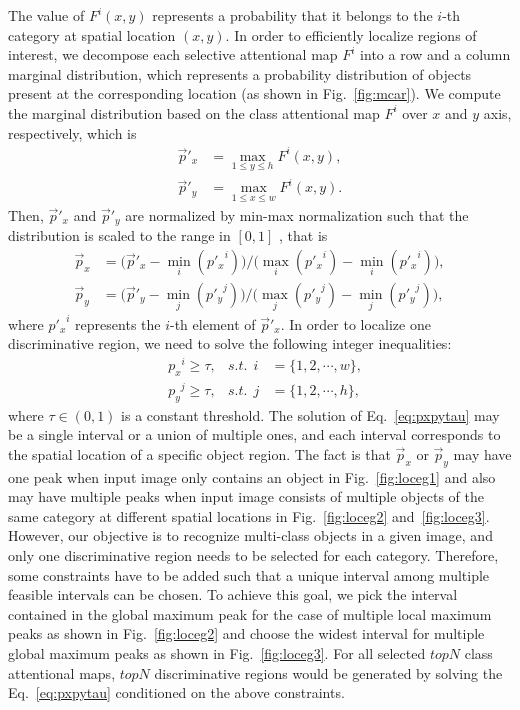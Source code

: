 \documentclass[journal]{IEEEtran}
\begin{document}
The value of $F^i(x,y)$ represents a probability that it belongs to the $i$-th category at spatial location $(x,y)$. 
In order to efficiently localize regions of interest, we decompose each selective attentional map $F^i$ into a row and a column marginal distribution, which represents a probability distribution of objects present at the corresponding location (as shown in Fig.~\ref{fig:mcar}). We compute the marginal distribution based on the class attentional map $F^i$ over $x$ and $y$ axis, respectively, which is
 \begin{equation}\label{eq:margin}
 \begin{aligned}
 \vec p'_x &= \max_{1\leq y \leq h}F^i(x,y), \\
 \vec p'_y &= \max_{1\leq x \leq w}F^i(x,y).
 \end{aligned}
 \end{equation}
 Then, $\vec p'_x$ and $\vec p'_y$ are normalized by min-max normalization such that the distribution is scaled to the range in $[0,1]$ , that is
 \begin{equation}
 \begin{aligned}
\vec p_x &= \big(\vec p'_x - \min_i ({p'_x}^i)\big)/\big (\max_i ({p'_x}^i)- \min_i ({p'_x}^i)\big), \\
\vec p_y &= \big(\vec p'_y - \min_j ({p'_y}^j)\big)/\big(\max_j ({p'_y}^j)- \min_j ({p'_y}^j) \big),
 \end{aligned}
 \end{equation}
where ${p'_x}^i$ represents the $i$-th element of $\vec p'_x$. In order to localize one discriminative region, we need to solve the following integer inequalities:
 \begin{equation}\label{eq:pxpytau}
 \begin{aligned}
 &{p_x}^i  \geq \tau, &s.t. ~~i&=\{1,2,\cdots,w\},\\
 &{p_y}^j  \geq \tau, &s.t. ~~j&=\{1,2,\cdots, h\},
  \end{aligned}
 \end{equation}
where $\tau \in (0,1)$ is a constant threshold. The solution of Eq.~\ref{eq:pxpytau} may be a single interval or a union of multiple ones, and each interval corresponds to the spatial location of a specific object region. The fact is that $\vec p_x$ or $\vec p_y$ may have one peak when input image only contains an object in Fig.~\ref{fig:loceg1} and also may have multiple peaks when input image consists of multiple objects of the same category at different spatial locations in Fig.~\ref{fig:loceg2} and~\ref{fig:loceg3}. However, our objective is to recognize multi-class objects in a given image, and only one discriminative region needs to be selected for each category. Therefore, some constraints have to be added such that a unique interval among multiple feasible intervals can be chosen. To achieve this goal, we pick the interval contained in the global maximum peak for the case of multiple local maximum peaks as shown in Fig.~\ref{fig:loceg2} and choose the widest interval for multiple global maximum peaks as shown in Fig.~\ref{fig:loceg3}. For all selected $topN$ class attentional maps, $topN$ discriminative regions would be generated by solving the Eq.~\ref{eq:pxpytau} conditioned on the above constraints.
\end{document}
